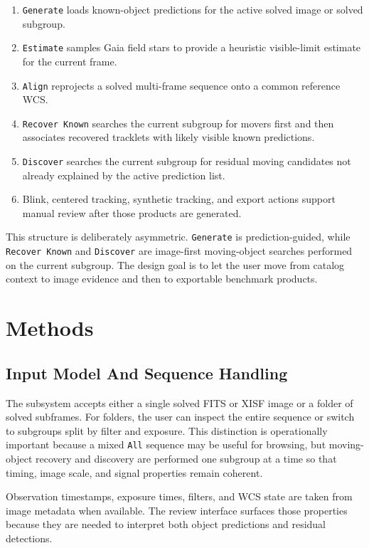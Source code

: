 \documentclass[modern]{aastex701}
\begin{document}
\begin{enumerate}
\item \texttt{Generate} loads known-object predictions for the active solved image or solved subgroup.
\item \texttt{Estimate} samples Gaia field stars to provide a heuristic visible-limit estimate for the current frame.
\item \texttt{Align} reprojects a solved multi-frame sequence onto a common reference WCS.
\item \texttt{Recover Known} searches the current subgroup for movers first and then associates recovered tracklets with likely visible known predictions.
\item \texttt{Discover} searches the current subgroup for residual moving candidates not already explained by the active prediction list.
\item Blink, centered tracking, synthetic tracking, and export actions support manual review after those products are generated.
\end{enumerate}

This structure is deliberately asymmetric. \texttt{Generate} is prediction-guided, while \texttt{Recover Known} and \texttt{Discover} are image-first moving-object searches performed on the current subgroup. The design goal is to let the user move from catalog context to image evidence and then to exportable benchmark products.

\section{Methods}\label{sec:methods}

\subsection{Input Model And Sequence Handling}\label{subsec:inputs}

The subsystem accepts either a single solved FITS or XISF image or a folder of solved subframes. For folders, the user can inspect the entire sequence or switch to subgroups split by filter and exposure. This distinction is operationally important because a mixed \texttt{All} sequence may be useful for browsing, but moving-object recovery and discovery are performed one subgroup at a time so that timing, image scale, and signal properties remain coherent.

Observation timestamps, exposure times, filters, and WCS state are taken from image metadata when available. The review interface surfaces those properties because they are needed to interpret both object predictions and residual detections.
\end{document}
